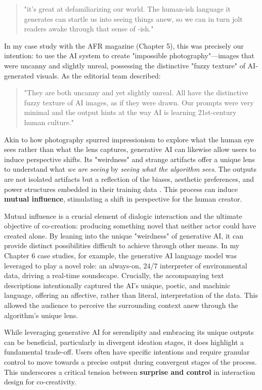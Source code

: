 \begin{quote}
"it’s great at defamiliarizing our world. The human-ish language it generates can startle us into seeing things anew, so we can in turn jolt readers awake through that sense of -ish."
\end{quote}

In my case study with the AFR magazine (Chapter 5), this was precisely our intention: to use the AI system to create "impossible photography"—images that were uncanny and slightly unreal, possessing the distinctive "fuzzy texture" of AI-generated visuals. As the editorial team described:

\begin{quote}
"They are both uncanny and yet slightly unreal. All have the distinctive fuzzy texture of AI images, as if they were drawn. Our prompts were very minimal and the output hints at the way AI is learning 21st-century human culture."
\end{quote}

Akin to how photography spurred impressionism to explore what the human eye sees rather than what the lens captures, generative AI can likewise allow users to induce perspective shifts. Its "weirdness" and strange artifacts offer a unique lens to understand what \textit{we are seeing} by \textit{seeing what the algorithm sees}. The outputs are not isolated artifacts but a reflection of the biases, aesthetic preferences, and power structures embedded in their training data \cite{Schaerf2024-gf, Cetinic2022-tw, Rodriguez-Ortega2022-ak, Salvaggio2023-cv}. This process can induce \textbf{mutual influence}, stimulating a shift in perspective for the human creator.

Mutual influence is a crucial element of dialogic interaction and the ultimate objective of co-creation: producing something novel that neither actor could have created alone. By leaning into the unique "weirdness" of generative AI, it can provide distinct possibilities difficult to achieve through other means. In my Chapter 6 case studies, for example, the generative AI language model was leveraged to play a novel role: an always-on, 24/7 interpreter of environmental data, driving a real-time soundscape. Crucially, the accompanying text descriptions intentionally captured the AI's unique, poetic, and machinic language, offering an affective, rather than literal, interpretation of the data. This allowed the audience to perceive the surrounding context anew through the algorithm's unique lens.

While leveraging generative AI for serendipity and embracing its unique outputs can be beneficial, particularly in divergent ideation stages, it does highlight a fundamental trade-off. Users often have specific intentions and require granular control to move towards a precise output during convergent stages of the process. This underscores a critical tension between \textbf{surprise and control} in interaction design for co-creativity.


